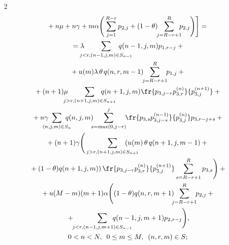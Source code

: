 \begin{multicols}{2}
\begin{multline}
{}+n\mu  + n\gamma + 

m\alpha \Bigg( \sum\limits_{j=1}^{R-r} p_{2,j} +(1-\theta) \!\! \sum\limits_{j=R-

r+1}^R \!\!\! p_{2,j} \Bigg) \Bigg] = {} \\

{}  = \lambda \!\! \!\!\! \sum\limits_{j<r, (n-1,j,m) \in S_{n-1}} \!\!\!\!\!\!\!\!\!\!\!\!\! q(n-

1,j,m)p_{1,r-j} + {}\\

{}+u(m) \lambda\, \theta\, q(n,r,m-1) \!\! \sum\limits_{j=R-r+1}^R \!\!

p_{1,j} +{} \\

{}+ (n+1)\mu \!\!\!\!\! \sum\limits_{j>r, (n+1,j,m) \in S_{n+1}} \!\!\!\!\!\!\!\!\!\!\!\!\!\!

q(n+1,j,m) \fr{p_{3,j-r} p_{3,r}^{(n)}}{ p_{3,j}^{(n+1)} } +{}\\

{}+  n\gamma \!\!\!\!\!\!

 \sum\limits_{(n,j,m) \in S_n} \!\!\!\!\!\! q(n,j,m) \!\!\! \sum\limits_{s=\max(0,j-r)}^j\!\! 

 \fr{p_{3,s} p_{3,j-s}^{(n-1)} }{ p_{3,j}^{(n)} }\,\! p_{3,r-j+s} + {} \\

{}+ (n+1)\gamma \Bigg( \sum\limits_{j>r, (n+1,j,m) \in S_{n+1}} \!\!\!\!\!\!\!\!\!\!\!\!\! \left( 

u(m)\,\theta \,q(n+1,j,m-1) +{}\right.\\

\left.{}+(1-\theta)q(n+1,j,m) \right) \fr{ p_{3,j-r}p_{3,r}^{(n)} }{ p_{3,j}^{(n+1)} } 

\sum\limits_{s=R-r+1}^R p_{3,s}  \Bigg) + {} \\

{}+ u(M-m)(m+1)\alpha \Bigg( (1-\theta)q(n,r,m+1) \!\!\!\sum\limits_{j=R-r+1}^R \!\! p_{2,j} + {}\\

{}+ \!\! \sum\limits_{j<r, (n-1,j,m+1) \in S_{n-1}} \!\! \!\!\!\!\!\!\!\!\!\! \!\! \!\! \!\!q(n-1,j,m+1)p_{2,r-j} \Bigg) ,  \\

0<n<N, \enskip 0 \leq m \leq M, \enskip (n,r,m) \in S; 

\end{multline}



\vspace*{-12pt}




\end{multicols}
